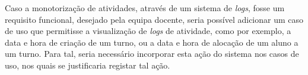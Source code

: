 \documentclass[a4paper,12pt]{scrreprt}
\begin{document}
\vspace{1cm}

Caso a monotorização de atividades, através de um sistema de \textit{logs}, fosse um requisito funcional,
desejado pela equipa docente, seria possível adicionar um caso de uso que permitisse a visualização
de \textit{logs} de atividade, como por exemplo, a data e hora de criação de um turno,
ou a data e hora de alocação de um aluno a um turno. Para tal, seria necessário
incorporar esta ação do sistema nos casos de uso, nos quais se justificaria registar tal ação.




%
%



\end{document}
